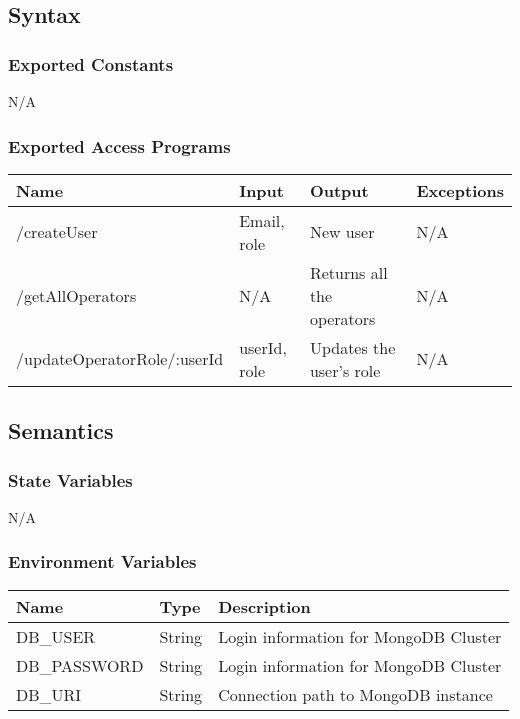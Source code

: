 \documentclass[12pt, titlepage]{article}
\begin{document}
\subsection{Syntax}

\subsubsection{Exported Constants}
N/A

\subsubsection{Exported Access Programs}


\begin{center}
\begin{tabular}{p{6cm} p{2cm} p{4cm} p{2cm}}
\hline
\textbf{Name} & \textbf{Input} & \textbf{Output} & \textbf{Exceptions}\\
\hline
/createUser& Email, role& New user& N/A\\
\hline
/getAllOperators& N/A&  Returns all the operators& N/A\\
\hline
/updateOperatorRole/:userId& userId, role& Updates the user’s role& N/A\\

\end{tabular}

\end{center}

\subsection{Semantics}

\subsubsection{State Variables}

N/A

\subsubsection{Environment Variables}

\begin{center}
\begin{tabular}{|p{4cm} |p{4cm} |p{4cm}|}
\hline
\textbf{Name} & \textbf{Type} & \textbf{Description} \\
\hline
DB\_USER & String& Login information for MongoDB Cluster \\
\hline
DB\_PASSWORD & String & Login information for MongoDB Cluster \\
\hline
DB\_URI & String & Connection path to MongoDB instance \\
\hline
\end{tabular}
\end{center}
\end{document}
